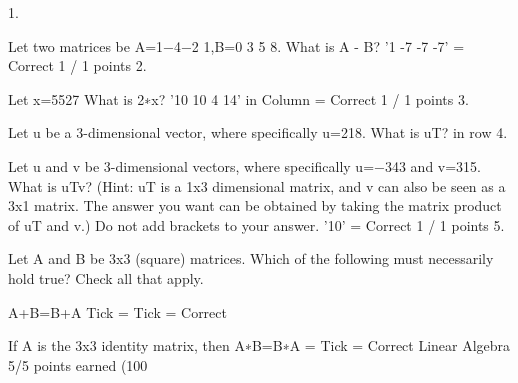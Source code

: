 1.

Let two matrices be A=1−4−2 1,B=0 3 5 8. What is A - B? '1 -7 -7 -7' = Correct 1 / 1 points
2. 

Let x=5527 What is 2∗x? '10 10 4 14' in Column = Correct 1 / 1 points
3. 

Let u be a 3-dimensional vector, where specifically u=218. What is uT? in row
4. 

Let u and v be 3-dimensional vectors, where specifically u=−343 and v=315.
What is uTv? (Hint: uT is a 1x3 dimensional matrix, and v can also be seen as a 3x1 matrix. The answer you want can be obtained by taking the matrix product of uT and v.) Do not add brackets to your answer. '10' = Correct 1 / 1 points
5. 

Let A and B be 3x3 (square) matrices. Which of the following must necessarily hold true? Check all that apply.

A+B=B+A Tick = Tick = Correct 

If A is the 3x3 identity matrix, then A∗B=B∗A = Tick = Correct  
Linear Algebra
5/5 points earned (100%
